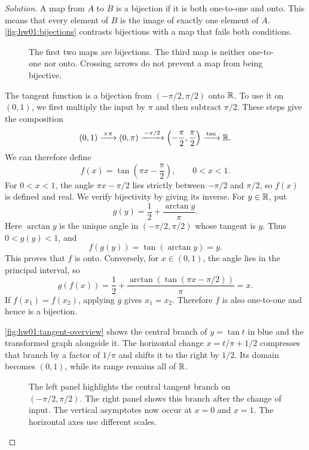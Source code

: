 
\begin{proof}[Solution]
A map from $A$ to $B$ is a bijection if it is both one-to-one
and onto. This means that every element of $B$ is the image of
exactly one element of $A$.
\autoref{fig:hw01:bijections} contrasts bijections with a map
that fails both conditions.

\begin{figure}[h]
  \centering
  
  \caption[Examples of bijections.]{The first two maps are bijections. The third map is neither
    one-to-one nor onto. Crossing arrows do not prevent a map from
    being bijective.}
  \label{fig:hw01:bijections}
\end{figure}

The tangent function is a bijection from
$(-\pi/2,\pi/2)$ onto $\mathbb{R}$. To use it on $(0,1)$, we first
multiply the input by $\pi$ and then subtract $\pi/2$.
These steps give the composition
\[
  (0,1)\xrightarrow{\,\times\pi\,}(0,\pi)
    \xrightarrow{\,-\pi/2\,}
    \left(-\frac\pi2,\frac\pi2\right)
    \xrightarrow{\,\tan\,}\mathbb{R}.
\]
We can therefore define
\[
  f(x)=\tan\left(\pi x-\frac\pi2\right),
    \qquad 0<x<1.
\]
For $0<x<1$, the angle $\pi x-\pi/2$ lies strictly between
$-\pi/2$ and $\pi/2$, so $f(x)$ is defined and real.
We verify bijectivity by giving its inverse. For $y\in\mathbb{R}$, put
\[
  g(y)=\frac12+\frac{\arctan y}{\pi}.
\]
Here $\arctan y$ is the unique angle in $(-\pi/2,\pi/2)$
whose tangent is $y$. Thus $0<g(y)<1$, and
\[
  f(g(y))=\tan(\arctan y)=y.
\]
This proves that $f$ is onto. Conversely, for $x\in(0,1)$,
the angle lies in the principal interval, so
\[
  g(f(x))=\frac12+
    \frac{\arctan(\tan(\pi x-\pi/2))}{\pi}=x.
\]
If $f(x_1)=f(x_2)$, applying $g$ gives $x_1=x_2$.
Therefore $f$ is also one-to-one and hence is a bijection.
\handoutonly{\clearpage}

\autoref{fig:hw01:tangent-overview} shows the central branch of
$y=\tan t$ in blue and the transformed graph alongside it.
The horizontal change $x=t/\pi+1/2$ compresses that branch by a
factor of $1/\pi$ and shifts it to the right by $1/2$.
Its domain becomes $(0,1)$, while its range remains all of $\mathbb{R}$.

\begin{figure}[h]
  \centering
  
  \caption[Mapping an interval onto the real line.]{The left panel highlights the central tangent branch on
    $(-\pi/2,\pi/2)$. The right panel shows this branch after the
    change of input. The vertical asymptotes now occur at $x=0$
    and $x=1$. The horizontal axes use different scales.}
  \label{fig:hw01:tangent-overview}
\end{figure}
\end{proof}
